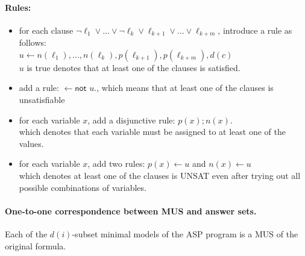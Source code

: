 \documentclass{article}
\begin{document}
\paragraph{Rules:}
\begin{itemize}
    \item for each clause $\neg{\ell_1} \vee \ldots \vee 
    \neg{\ell_k} \vee \ell_{k+1} \vee \ldots \vee \ell_{k+m}$, 
    introduce a rule as follows:\\
    $u \leftarrow n(\ell_1), \ldots, n(\ell_k), p(\ell_{k+1}), p(\ell_{k+m}), d(c)$\\
    $u$ is true denotes that at least one of the clauses is satisfied.
    \item add a rule: $\leftarrow \textsf{not } u.$,
    which means that at least one of the clauses is unsatisfiable
    \item for each variable $x$, add a disjunctive rule: $p(x) ; n(x).$\\
    which denotes that each variable must be assigned to at least one of the values.
    \item for each variable $x$, add two rules: $p(x) \leftarrow u$ and $n(x) \leftarrow u$\\
    which denotes at least one of the clauses is UNSAT even after trying out all possible combinations of variables.
\end{itemize}
\paragraph{One-to-one correspondence between MUS and answer sets.}
Each of the $d(i)$-subset minimal models of the ASP program is a MUS of the original formula. 


 

\end{document}
